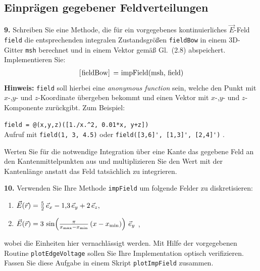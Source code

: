 \documentclass[Protokollheft.tex]{subfiles}
\begin{document}
{\subsection{Einprägen gegebener Feldverteilungen}}

        \begin{framed}
	\noindent \textbf{9.} Schreiben Sie eine Methode, die für ein
        vorgegebenes kontinuierliches $\vec{E}$-Feld \lstinline{field}
        die entsprechenden integralen Zustandsgrößen \lstinline{fieldBow}
        in einem 3D-Gitter \lstinline{msh} berechnet und in einem Vektor gemäß
        Gl.~(2.8) abspeichert. Implementieren Sie:
        \begin{align}
            \lstinline{[fieldBow] = impField(msh, field)}
        \end{align}
        {\textbf{Hinweis:}} \lstinline{field} soll hierbei eine \emph{anonymous function} sein, welche den Punkt mit $x$-,$y$- und $z$-Koordinate übergeben bekommt und einen Vektor mit $x$-,$y$- und $z$-Komponente zurückgibt. Zum Beispiel:
        \begin{center}
            \lstinline{field = @(x,y,z)([1./x.^2, 0.01*x, y+z])}\\
            Aufruf mit \lstinline{field(1, 3, 4.5)} oder \lstinline{field([3,6]', [1,3]', [2,4]')} \; .
        \end{center}
        Werten Sie für die notwendige Integration über eine Kante das gegebene Feld an den Kantenmittelpunkten aus und multiplizieren Sie den Wert mit
        der Kantenlänge anstatt das Feld tatsächlich zu integrieren.\label{exer:impField}
\end{framed}


\newpage
        \begin{framed}
	\noindent \textbf{10.} Verwenden Sie Ihre Methode \lstinline{impField} um folgende Felder zu diskretisieren:
        \begin{enumerate}
            \item $ \vec{E} (\vec r) = \frac{5}{2}\,  \vec{e}_x - 1,\!3\,  \vec{e}_y + 2\,  \vec{e}_z,$
            \item $ \vec{E} (\vec r) = 3\, \sin\! \left(\frac{\pi}{x_\text{max}-x_\text{min}}\, (x-x_\text{min}) \right)\,  \vec{e}_y$ ,
        \end{enumerate}
        wobei die Einheiten hier vernachlässigt werden. Mit Hilfe der vorgegebenen Routine \lstinline{plotEdgeVoltage} sollen Sie Ihre Implementation optisch verifizieren. Fassen Sie diese Aufgabe in einem Skript \lstinline{plotImpField} zusammen.\label{exer:plotImpField}
\end{framed}
	
\end{document}
